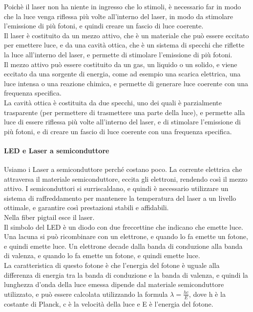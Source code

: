 Poichè il laser non ha niente in ingresso che lo stimoli, è necessario far in modo che la luce venga riflessa più volte all'interno del laser, in modo da stimolare l'emissione di più fotoni, e quindi creare un fascio di luce coerente.\\
Il laser è costituito da un mezzo attivo, che è un materiale che può essere eccitato per emettere luce, e da una cavità ottica, che è un sistema
di specchi che riflette la luce all'interno del laser, e permette di stimolare l'emissione di più fotoni.\\
Il mezzo attivo può essere costituito da un gas, un liquido o un solido, e viene eccitato da una sorgente di energia, come ad esempio una scarica elettrica, una luce intensa o una reazione chimica, 
e permette di generare luce coerente con una frequenza specifica.\\
La cavità ottica è costituita da due specchi, uno dei quali è parzialmente trasparente (per permettere di trasmettere una parte della luce), e permette alla luce di essere riflessa più volte all'interno del laser, 
e di stimolare l'emissione di più fotoni, e di creare un fascio di luce coerente con una frequenza specifica.\\

\paragraph{LED e Laser a semiconduttore}

Usiamo i Laser a semiconduttore perché costano poco. La corrente elettrica che attraversa il materiale semiconduttore, eccita gli elettroni, rendendo così il mezzo attivo.
I semiconduttori si surriscaldano, e quindi è necessario utilizzare un sistema di raffreddamento per mantenere la temperatura del laser a un livello ottimale, e garantire così prestazioni stabili e affidabili.\\

Nella fiber pigtail esce il laser.\\

Il simbolo del LED è un diodo con due freccettine che indicano che emette luce. Una lacuna si può ricombinare con un elettrone, e quando lo fa emette un fotone, e quindi emette luce.
Un elettrone decade dalla banda di conduzione alla banda di valenza, e quando lo fa emette un fotone, e quindi emette luce.\\
La caratteristica di questo fotone è che l'energia del fotone è uguale alla differenza di energia tra la banda di conduzione e la banda di valenza, 
e quindi la lunghezza d'onda della luce emessa dipende dal materiale semiconduttore utilizzato, e può essere calcolata utilizzando la formula $\lambda = \frac{hc}{E}$, 
dove h è la costante di Planck, c è la velocità della luce e E è l'energia del fotone.\\

